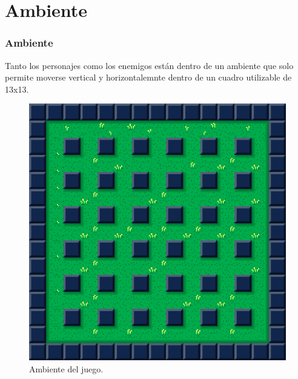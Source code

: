 \documentclass{beamer}
\begin{document}
\section{Ambiente}

\begin{frame}
\frametitle{Ambiente}
Tanto los personajes como los enemigos están dentro de un ambiente que solo permite moverse vertical y horizontalemnte dentro de un cuadro utilizable de 13x13. 
\begin{figure}[H]
	\centering
	\includegraphics[scale=0.7]{assets/menues/background.png}
    \caption{Ambiente del juego.}
    \label{fig:ambiente del juego}
\end{figure}

\end{frame}
\end{document}
